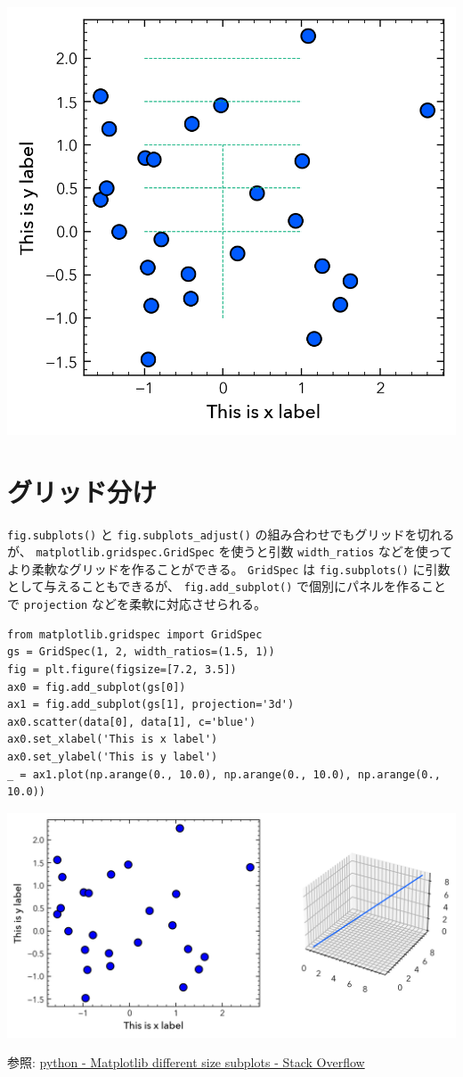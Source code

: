 \documentclass[a4paper, 10pt, notitlepage, twocolumn, uplatex, oneside, dvipdfmx]{jsarticle}
\begin{document}
\begin{center}
\includegraphics[width=1.0\linewidth]{./obipy-resources/params_lines.png}
\end{center}
\section{グリッド分け}
\label{sec:org6ee1f4f}
\texttt{fig.subplots()} と \texttt{fig.subplots\_adjust()} の組み合わせでもグリッドを切れるが、
\texttt{matplotlib.gridspec.GridSpec} を使うと引数 \texttt{width\_ratios} などを使ってより柔軟なグリッドを作ることができる。
\texttt{GridSpec} は \texttt{fig.subplots()} に引数として与えることもできるが、
\texttt{fig.add\_subplot()} で個別にパネルを作ることで \texttt{projection} などを柔軟に対応させられる。
\begin{verbatim}
from matplotlib.gridspec import GridSpec
gs = GridSpec(1, 2, width_ratios=(1.5, 1))
fig = plt.figure(figsize=[7.2, 3.5])
ax0 = fig.add_subplot(gs[0])
ax1 = fig.add_subplot(gs[1], projection='3d')
ax0.scatter(data[0], data[1], c='blue')
ax0.set_xlabel('This is x label')
ax0.set_ylabel('This is y label')
_ = ax1.plot(np.arange(0., 10.0), np.arange(0., 10.0), np.arange(0., 10.0))
\end{verbatim}

\begin{center}
\includegraphics[width=1.0\linewidth]{./obipy-resources/params_grids.png}
\end{center}

参照: \href{https://stackoverflow.com/questions/10388462/matplotlib-different-size-subplots}{python - Matplotlib different size subplots - Stack Overflow}
\end{document}
